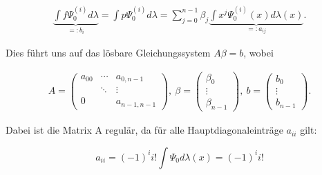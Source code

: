 \begin{solution}
\begin{align*}
    \underbrace{\int f \Psi_0^{(i)} d \lambda}_{=: b_i}
    = \int p \Psi_0^{(i)} d \lambda
    = \sum_{j=0}^{n-1}
      \beta_j
      \underbrace{\int x^j \Psi_0^{(i)}(x) d \lambda(x)}_{=: a_{ij}}.
\end{align*}

Dies führt uns auf das lösbare Gleichungssystem $A \beta = b$, wobei

\begin{align*}
  A =
  \begin{pmatrix}
    a_{00} & \cdots & a_{0, n-1}   \\
           & \ddots & \vdots       \\
    0      &        & a_{n-1, n-1}
  \end{pmatrix}, \:
  \beta =
  \begin{pmatrix}
  \beta_0 \\
  \vdots  \\
  \beta_{n-1}
  \end{pmatrix}, \:
  b =
  \begin{pmatrix}
    b_0    \\
    \vdots \\
    b_{n-1}
  \end{pmatrix}.
\end{align*}

 Dabei ist die Matrix A regulär, da für alle Hauptdiagonaleinträge $a_{ii}$ gilt:

 \begin{equation*}
   a_{ii} = (-1)^ii!\int\Psi_0 d\lambda(x) = (-1)^ii!
 \end{equation*}

\end{solution}
